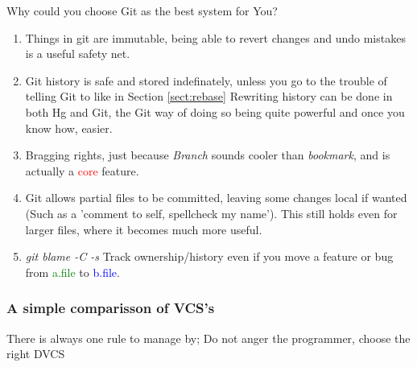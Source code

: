 Why could you choose Git as the best system for You?
\begin{enumerate}
\item
Things in git are immutable, being able to revert changes and undo mistakes is a useful safety net.

\item
Git history is safe and stored indefinately, unless you go to the trouble of telling Git to like in Section \ref{sect:rebase}
Rewriting history can be done in both Hg and Git, the Git way of doing so being quite powerful and once you know how, easier.

\item
Bragging rights, just because \textit{Branch} sounds cooler than \textit{bookmark}, and is actually a \textcolor{red}{core} feature.

\item
Git allows partial files to be committed, leaving some changes local if wanted (Such as a 'comment to self, spellcheck my name').
This still holds even for larger files, where it becomes much more useful.

\item
\large{\textit{git blame -C -s}}
Track ownership/history even if you move a feature or bug from \textcolor{green}{a.file} to \textcolor{blue}{b.file}.


\end{enumerate}


\subsubsection{A simple comparisson of VCS's}
There is always one rule to manage by;
Do not anger the programmer, choose the right DVCS

